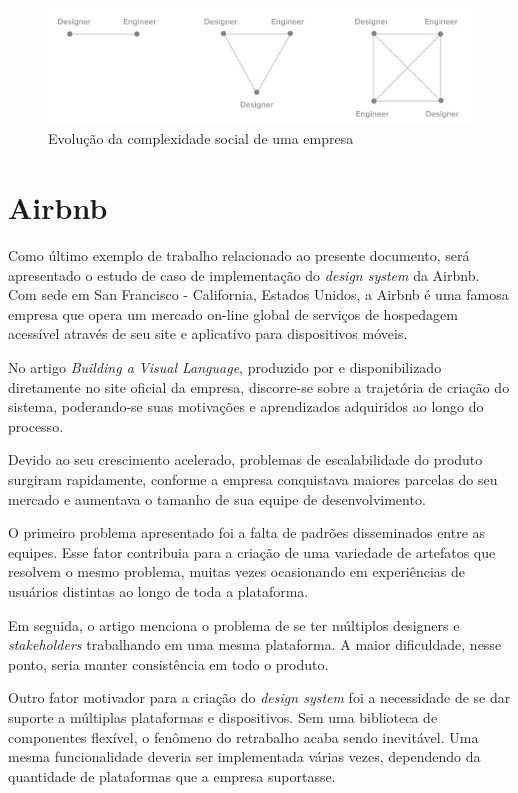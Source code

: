 \begin{figure}
	\includegraphics[width=\linewidth]{./04-figuras/03_trabalhos_relacionados/social-complexity.png}
    \caption{Evolução da complexidade social de uma empresa}
    \label{fig:socialComplexityIncrease}
\end{figure}

\section{Airbnb}
\label{sec:airbnb}

Como último exemplo de trabalho relacionado ao presente documento, será apresentado o estudo de caso de implementação do \textit{design system} da Airbnb. Com sede em San Francisco - California, Estados Unidos, a Airbnb é uma famosa empresa que opera um mercado on-line global de serviços de hospedagem acessível através de seu site e aplicativo para dispositivos móveis.

No artigo \textit{Building a Visual Language}, produzido por  e disponibilizado diretamente no site oficial da empresa, discorre-se sobre a trajetória de criação do sistema, poderando-se suas motivações e aprendizados adquiridos ao longo do processo.

Devido ao seu crescimento acelerado, problemas de escalabilidade do produto surgiram rapidamente, conforme a empresa conquistava maiores parcelas do seu mercado e aumentava o tamanho de sua equipe de desenvolvimento.

O primeiro problema apresentado foi a falta de padrões disseminados entre as equipes. Esse fator contribuia para a criação de uma variedade de artefatos que resolvem o mesmo problema, muitas vezes ocasionando em experiências de usuários distintas ao longo de toda a plataforma.

Em seguida, o artigo menciona o problema de se ter múltiplos designers e \textit{stakeholders} trabalhando em uma mesma plataforma. A maior dificuldade, nesse ponto, seria manter consistência em todo o produto.

Outro fator motivador para a criação do \textit{design system} foi a necessidade de se dar suporte a múltiplas plataformas e dispositivos. Sem uma biblioteca de componentes flexível, o fenômeno do retrabalho acaba sendo inevitável. Uma mesma funcionalidade deveria ser implementada várias vezes, dependendo da quantidade de plataformas que a empresa suportasse.

